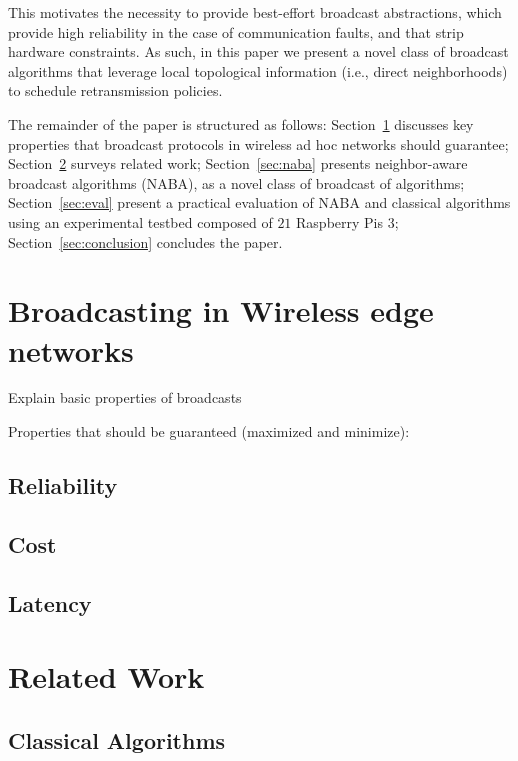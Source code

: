 \documentclass[conference]{IEEEtran}
\begin{document}
This motivates the necessity to provide best-effort broadcast abstractions, which provide high reliability in the case of communication faults, and that strip hardware constraints. As such, in this paper we present a novel class of broadcast algorithms that leverage local topological information (i.e., direct neighborhoods) to schedule retransmission policies.

The remainder of the paper is structured as follows:
Section~\ref{sec:bcast} discusses key properties that broadcast protocols in wireless ad hoc networks should guarantee;
Section~\ref{sec:related} surveys related work;
Section~\ref{sec:naba} presents neighbor-aware broadcast algorithms (NABA), as a novel class of broadcast of algorithms;
Section~\ref{sec:eval} present a practical evaluation of NABA and classical algorithms using an experimental testbed composed of $21$ Raspberry Pis 3;
Section~\ref{sec:conclusion} concludes the paper.

\section{Broadcasting in Wireless edge networks}\label{sec:bcast}
Explain basic properties of broadcasts

Properties that should be guaranteed (maximized and minimize):
\subsection{Reliability}

\subsection{Cost}

\subsection{Latency}

\section{Related Work}\label{sec:related}

\subsection{Classical Algorithms}
\end{document}

